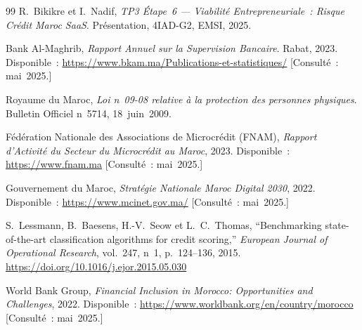 \documentclass[12pt, a4paper]{report}
\begin{document}
\begin{thebibliography}{99}
R.~Bikikre et I.~Nadif,
\textit{TP3 Étape~6 --- Viabilité Entrepreneuriale~: Risque Crédit Maroc SaaS}.
Présentation, 4IAD-G2, EMSI, 2025.

Bank Al-Maghrib,
\textit{Rapport Annuel sur la Supervision Bancaire}. Rabat, 2023.
Disponible~: \url{https://www.bkam.ma/Publications-et-statistiques/}
[Consulté~: mai~2025.]

Royaume du Maroc,
\textit{Loi n\textdegree~09-08 relative à la protection des personnes physiques}.
Bulletin Officiel n\textdegree~5714, 18~juin~2009.

Fédération Nationale des Associations de Microcrédit (FNAM),
\textit{Rapport d'Activité du Secteur du Microcrédit au Maroc}, 2023.
Disponible~: \url{https://www.fnam.ma} [Consulté~: mai~2025.]

Gouvernement du Maroc,
\textit{Stratégie Nationale Maroc Digital 2030}, 2022.
Disponible~: \url{https://www.mcinet.gov.ma/} [Consulté~: mai~2025.]

S.~Lessmann, B.~Baesens, H.-V.~Seow et L.~C.~Thomas,
``Benchmarking state-of-the-art classification algorithms for credit scoring,''
\textit{European Journal of Operational Research}, vol.~247, n\textdegree~1,
p.~124--136, 2015. \url{https://doi.org/10.1016/j.ejor.2015.05.030}

World Bank Group,
\textit{Financial Inclusion in Morocco: Opportunities and Challenges}, 2022.
Disponible~: \url{https://www.worldbank.org/en/country/morocco} [Consulté~: mai~2025.]

\end{thebibliography}
\end{document}
